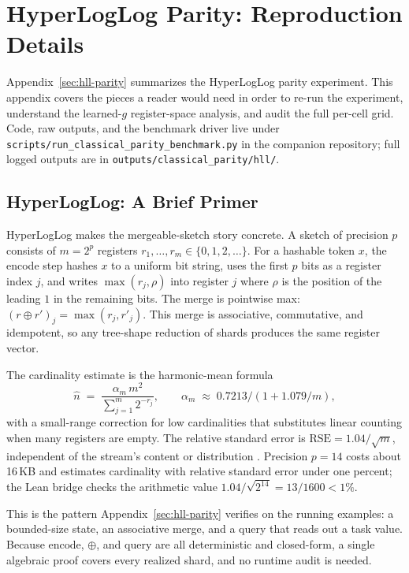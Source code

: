 \section{HyperLogLog Parity: Reproduction Details}\label{app:classical-parity}

Appendix~\ref{sec:hll-parity} summarizes the HyperLogLog parity
experiment. This appendix covers the pieces a reader would need in
order to re-run the experiment, understand the learned-$g$
register-space analysis, and audit the full per-cell grid. Code, raw
outputs, and the benchmark driver live under
\texttt{scripts/run\_classical\_parity\_benchmark.py} in the companion
repository; full logged outputs are in \texttt{outputs/classical\_parity/hll/}.

\subsection{HyperLogLog: A Brief Primer}\label{app:hll-primer}

HyperLogLog makes the mergeable-sketch story concrete. A sketch of
precision $p$ consists of $m = 2^p$ registers $r_1, \ldots, r_m \in
\{0, 1, 2, \ldots\}$. For a hashable token $x$, the encode step hashes
$x$ to a uniform bit string, uses the first $p$ bits as a register
index $j$, and writes $\max(r_j, \rho)$ into register $j$ where $\rho$
is the position of the leading $1$ in the remaining bits. The merge
is pointwise max: $(r \oplus r')_j = \max(r_j, r'_j)$. This merge is
associative, commutative, and idempotent, so any tree-shape reduction
of shards produces the same register vector.

The cardinality estimate is the harmonic-mean formula
\[
\hat n \;=\; \frac{\alpha_m \, m^2}{\sum_{j=1}^m 2^{-r_j}},
\qquad
\alpha_m \;\approx\; 0.7213 / (1 + 1.079/m),
\]
with a small-range correction for low cardinalities that substitutes
linear counting when many registers are empty. The relative standard
error is $\mathrm{RSE} = 1.04/\sqrt{m}$, independent of the stream's
content or distribution \citep{FlajoletEtAl2007}. Precision $p=14$
costs about 16\,KB and estimates cardinality with relative standard
error under one percent; the Lean bridge checks the arithmetic value
$1.04/\sqrt{2^{14}}=13/1600<1\%$.

This is the pattern Appendix~\ref{sec:hll-parity} verifies on the
running examples: a bounded-size state, an associative merge, and a
query that reads out a task value. Because $\mathrm{encode}$,
$\oplus$, and $\mathrm{query}$ are all deterministic and closed-form,
a single algebraic proof covers every realized shard, and no runtime
audit is needed.

